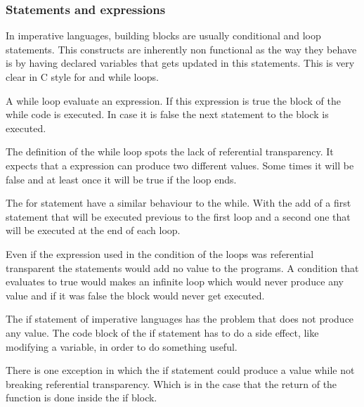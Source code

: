 \documentclass[../main.tex]{subfiles}
\begin{document}
\subsubsection{Statements and expressions}
In imperative languages, building blocks are usually conditional and loop statements. This constructs are inherently non functional as the way they behave is by having declared variables that gets updated in this statements. This is very clear in C style for and while loops. 

A while loop evaluate an expression. If this expression is true the block of the while code is executed. In case it is false the next statement to the block is executed.

The definition of the while loop spots the lack of referential transparency. It expects that a expression can produce two different values. Some times it will be false and at least once it will be true if the loop ends.

The for statement have a similar behaviour to the while. With the add of a first statement that will be executed previous to the first loop and a second one that will be executed at the end of each loop.

Even if the expression used in the condition of the loops was referential transparent the statements would add no value to the programs. A condition that evaluates to true would makes an infinite loop which would never produce any value and if it was false the block would never get executed.

The if statement of imperative languages has the problem that does not produce any value. The code block of the if statement has to do a side effect, like modifying a variable, in order to do something useful.

There is one exception in which the if statement could produce a value while not breaking referential transparency. Which is in the case that the return of the function is done inside the if block.
\end{document}
